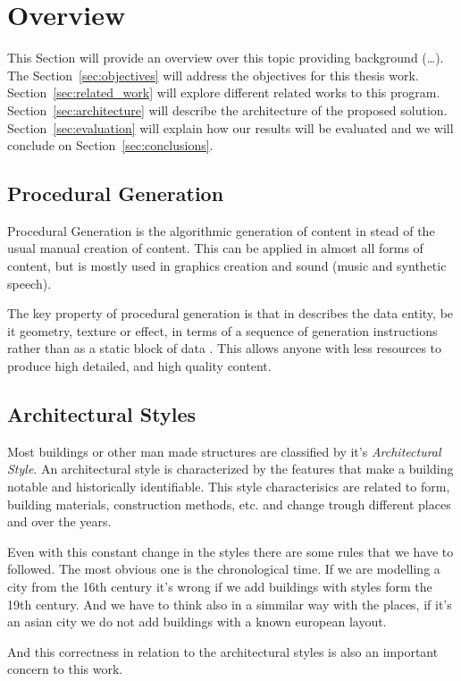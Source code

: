 
% 
% 

\section{Overview} %
\label{sec:overview}


This Section will provide an overview over this topic providing background (\dots). The Section~\ref{sec:objectives} will address the objectives for this thesis work. Section~\ref{sec:related_work} will explore different related works to this program. Section~\ref{sec:architecture} will describe the architecture of the proposed solution. Section~\ref{sec:evaluation} will explain how our results will be evaluated and we will conclude on Section~\ref{sec:conclusions}.

\subsection{Procedural Generation} %
\label{sub:procedural_generation}


Procedural Generation is the algorithmic generation of content in stead of the usual manual creation of content. This can be applied in almost all forms of content, but is mostly used in graphics creation and sound (music and synthetic speech).

The key property of procedural generation is that in describes the data entity, be it geometry, texture or effect, in terms of a sequence of generation instructions rather than as a static block of data \cite{Kelly}. This allows anyone with less resources to produce high detailed, and high quality content.




\subsection{Architectural Styles} %
\label{sub:architectural_styles}

Most buildings or other man made structures are classified by it's \emph{Architectural Style}. An architectural style is characterized by the features that make a building notable and historically identifiable. This style characterisics are related to form, building materials, construction methods, etc. and change trough different places and over the years. 

Even with this constant change in the styles there are some rules that we have to followed. The most obvious one is the chronological time.
If we are modelling a city from the 16th century it's wrong if we add buildings with styles form the 19th century. And we have to think also in a simmilar way with the places, if it's an asian city we do not add buildings with a known european layout.

And this correctness in relation to the architectural styles is also an important concern to this work.



